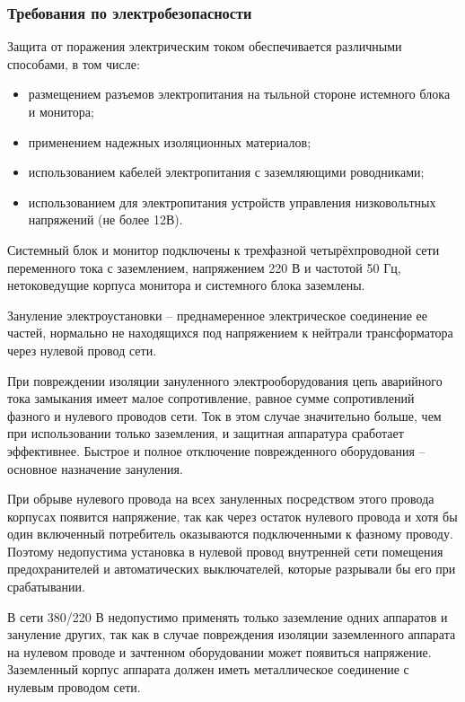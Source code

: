 \subsubsection{Требования по электробезопасности}
Защита от поражения электрическим током обеспечивается различными способами, в том числе:
\begin{itemize}
	\item размещением разъемов электропитания на тыльной стороне истемного блока и монитора;
	\item применением надежных изоляционных материалов;
	\item использованием кабелей электропитания с заземляющими роводниками;
	\item использованием для электропитания устройств управления низковольтных напряжений (не более 12В).
\end{itemize}

Системный блок и монитор подключены к трехфазной четырёхпроводной сети переменного тока с заземлением, напряжением 220 В и частотой 50 Гц, нетоковедущие корпуса монитора и системного блока заземлены.

Зануление электроустановки -- преднамеренное электрическое соединение ее частей, нормально не находящихся под напряжением к нейтрали трансформатора через нулевой провод сети.

При повреждении изоляции зануленного электрооборудования цепь аварийного тока замыкания имеет малое сопротивление, равное сумме сопротивлений фазного и нулевого проводов сети. Ток в этом случае значительно больше, чем при использовании только заземления, и защитная аппаратура сработает эффективнее. Быстрое и полное отключение поврежденного оборудования -- основное назначение зануления.

При обрыве нулевого провода на всех зануленных посредством этого провода корпусах появится напряжение, так как через остаток нулевого провода и хотя бы один включенный потребитель оказываются подключенными к фазному проводу. Поэтому недопустима установка в нулевой провод внутренней сети помещения предохранителей и автоматических выключателей, которые разрывали бы его при срабатывании.

В сети 380/220 В недопустимо применять только заземление одних аппаратов и зануление других, так как в случае повреждения изоляции заземленного аппарата на нулевом проводе и зачтенном оборудовании может появиться напряжение. Заземленный корпус аппарата должен иметь металлическое соединение с нулевым проводом сети.

